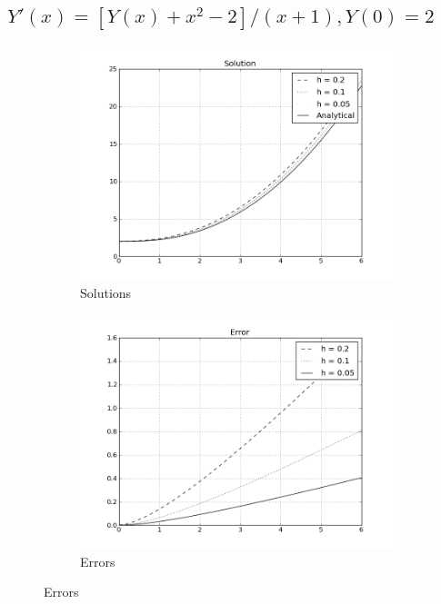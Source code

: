 \documentclass[12,a4paper]{article}
\begin{document}
    \subsection{$Y'(x) = [Y(x) + x^2 - 2]/(x+1), Y(0) = 2$}
    
    \begin{figure}[H]
        \centering
        \begin{subfigure}[t]{0.49\textwidth}
            \includegraphics[width = \textwidth]{plots/trapezoidal_2.png}
            \caption{Solutions}
            \label{fig:sol_t2}
        \end{subfigure}
        \begin{subfigure}[t]{0.49\textwidth}
            \includegraphics[width = \textwidth]{plots/trapezoidal_error_2.png}
            \caption{Errors}
            \label{fig:err_t2}
        \end{subfigure}
    \end{figure}
\end{document}

